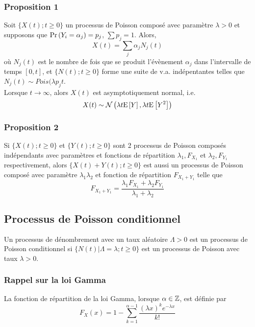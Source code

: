 \documentclass[10pt, french, landscape]{article}
\begin{document}
\begin{multicols*}{3}
\subsubsection*{Proposition 1}
Soit $\{ X(t) ; t \geq 0 \}$ un processus de Poisson composé avec paramètre $\lambda > 0$ et supposons que $\Pr \left( Y_i = \alpha_j \right) = p_j$, $\sum p_j = 1$. Alors,
\[X(t) = \sum_j \alpha_j N_j(t) \]
où $N_j(t)$ est le nombre de fois que se produit l'évènement $\alpha_j$ dans l'intervalle de temps $[0,t]$, et $\{N(t) ; t \geq 0  \}$ forme une suite de v.a. indépentantes telles que $N_j(t) \sim Pois(\lambda p_j t$. \\
Lorsque $t \to \infty$, alors $X(t)$ est asymptotiquement normal, i.e.
\[X(t) \sim \mathcal{N}\left( \lambda t \mathrm{E} \left[ Y \right], \lambda t \mathrm{E} \left[ Y^2 \right] \right)\]

\subsubsection*{Proposition 2}
Si $\{ X(t) ; t \geq 0 \}$ et $\{ Y(t) ; t \geq 0 \}$ sont 2 processus de Poisson composés indépendants avec paramètres et fonctions de répartition $\lambda_1, F_{X_1}$ et $\lambda_2, F_{Y_1}$ respectivement, alors $\{ X(t) + Y(t) ; t \geq 0 \}$ est aussi un processus de Poisson composé avec paramètre $\lambda_1  \lambda_2$ et fonction de répartition $F_{X_1 + Y_1}$ telle que
\[F_{X_1 + Y_1} = \frac{\lambda_1 F_{X_1} + \lambda_2 F_{Y_1}}{\lambda_1 + \lambda_2}  \]

\subsection*{Processus de Poisson conditionnel}
\begin{definition}[Définition]
Un processus de dénombrement avec un taux aléatoire $\Lambda > 0$ est un processus de Poisson conditionnel si $\{ N(t) | \Lambda = \lambda ; t \geq 0 \}$ est un processus de Poisson avec taux $\lambda > 0$.
\end{definition}

\subsubsection*{Rappel sur la loi Gamma}
La fonction de répartition de la loi Gamma, lorsque $\alpha \in \mathbb{Z}$, est définie par
\[F_X(x) = 1 - \sum_{k=1}^{\alpha-1} \frac{(\lambda x)^k e^{-\lambda x}}{k!}\]



\end{multicols*}
\end{document}
